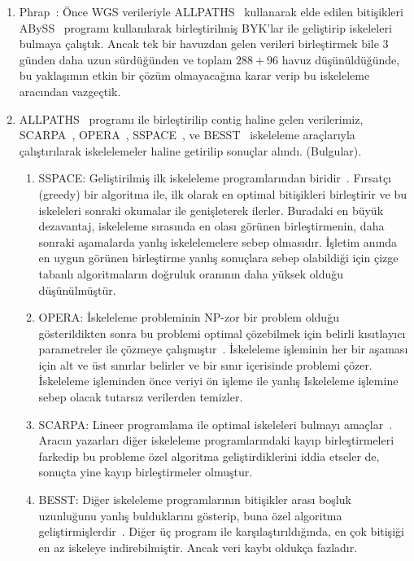 \documentclass[11pt]{article}
\begin{document}
\begin{enumerate}

\item Phrap~\cite{phrap}: Önce WGS verileriyle ALLPATHS~\cite{Gnerre2011} kullanarak elde edilen bitişikleri ABySS~\cite{Simpson2009} programı kullanılarak birleştirilmiş BYK'lar ile geliştirip iskeleleri bulmaya çalıştık. Ancak tek bir havuzdan gelen verileri birleştirmek bile  3 günden daha uzun sürdüğünden ve toplam $288 + 96$ havuz düşünüldüğünde, bu yaklaşımın etkin bir çözüm olmayacağına karar verip bu iskeleleme aracından vazgeçtik.
  
\item ALLPATHS~\cite{Gnerre2011} programı ile birleştirilip contig haline gelen verilerimiz, SCARPA~\cite{Donmez2013}, OPERA~\cite{Gao2011}, SSPACE~\cite{Boetzer2011}, ve BESST~\cite{Sahlin2014} iskeleleme araçlarıyla çalıştırılarak iskelelemeler haline getirilip sonuçlar alındı. (Bulgular). 
  
  \begin{enumerate}
    \item
      SSPACE: Geliştirilmiş ilk iskeleleme programlarından biridir~\cite{Boetzer2011}. Fırsatçı (greedy) bir algoritma ile, ilk olarak en optimal bitişikleri birleştirir ve bu iskeleleri sonraki okumalar ile genişleterek ilerler. Buradaki en büyük dezavantaj, iskeleleme sırasında en olası görünen birleştirmenin, daha sonraki aşamalarda yanlış iskelelemelere sebep olmasıdır. İşletim anında en uygun görünen birleştirme yanlış sonuçlara sebep olabildiği için çizge tabanlı algoritmaların doğruluk oranının daha yüksek olduğu düşünülmüştür. 

    \item OPERA: İskeleleme probleminin NP-zor bir problem olduğu gösterildikten sonra bu problemi optimal çözebilmek için belirli  kısıtlayıcı parametreler ile çözmeye çalışmıştır~\cite{Gao2011}. İskeleleme işleminin her bir aşaması için alt ve üst sınırlar belirler ve bir sınır içerisinde problemi çözer. İskeleleme işleminden önce veriyi ön işleme ile yanlış Iskeleleme işlemine sebep olacak  tutarsız verilerden temizler.
      
    \item SCARPA: Lineer programlama ile optimal iskeleleri bulmayı amaçlar~\cite{Donmez2013}. Aracın yazarları diğer iskeleleme programlarındaki kayıp birleştirmeleri farkedip bu probleme özel algoritma geliştirdiklerini iddia etseler de, sonuçta yine kayıp birleştirmeler olmuştur.
      
\item BESST: Diğer iskeleleme programlarının bitişikler arası boşluk uzunluğunu yanlış bulduklarını gösterip, buna özel algoritma geliştirmişlerdir~\cite{Sahlin2014}. Diğer üç program ile karşılaştırıldığında, en çok bitişiği en az iskeleye indirebilmiştir. Ancak veri kaybı oldukça fazladır.
  \end{enumerate}

\end{enumerate}
\end{document}
